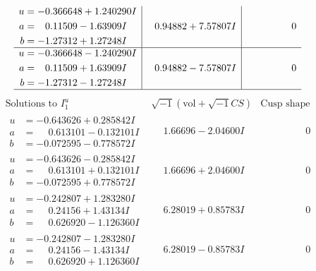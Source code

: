 \documentclass[1p]{elsarticle_modified}
\theoremstyle{definition}
\newcommand{\I}{\sqrt{-1}}
\begin{document}
$$\begin{array}{c|c|c}
\begin{aligned}
u &= -0.366648 + 1.240290 I \\
a &= \phantom{-}0.11509 - 1.63909 I \\
b &= -1.27312 + 1.27248 I\end{aligned}
 & \phantom{-}0.94882 + 7.57807 I & \phantom{-0.000000 } 0 \\ \hline\begin{aligned}
u &= -0.366648 - 1.240290 I \\
a &= \phantom{-}0.11509 + 1.63909 I \\
b &= -1.27312 - 1.27248 I\end{aligned}
 & \phantom{-}0.94882 - 7.57807 I & \phantom{-0.000000 } 0\\
 \hline 
 \end{array}$$\newpage$$\begin{array}{c|c|c}  
\text{Solutions to }I^u_{1}& \I (\text{vol} + \sqrt{-1}CS) & \text{Cusp shape}\\
 \hline 
\begin{aligned}
u &= -0.643626 + 0.285842 I \\
a &= \phantom{-}0.613101 - 0.132101 I \\
b &= -0.072595 - 0.778572 I\end{aligned}
 & \phantom{-}1.66696 - 2.04600 I & \phantom{-0.000000 } 0 \\ \hline\begin{aligned}
u &= -0.643626 - 0.285842 I \\
a &= \phantom{-}0.613101 + 0.132101 I \\
b &= -0.072595 + 0.778572 I\end{aligned}
 & \phantom{-}1.66696 + 2.04600 I & \phantom{-0.000000 } 0 \\ \hline\begin{aligned}
u &= -0.242807 + 1.283280 I \\
a &= \phantom{-}0.24156 + 1.43134 I \\
b &= \phantom{-}0.626920 - 1.126360 I\end{aligned}
 & \phantom{-}6.28019 + 0.85783 I & \phantom{-0.000000 } 0 \\ \hline\begin{aligned}
u &= -0.242807 - 1.283280 I \\
a &= \phantom{-}0.24156 - 1.43134 I \\
b &= \phantom{-}0.626920 + 1.126360 I\end{aligned}
 & \phantom{-}6.28019 - 0.85783 I & \phantom{-0.000000 } 0 \\ \hline\begin{aligned}

\end{aligned}
\end{array}$$
\end{document}
